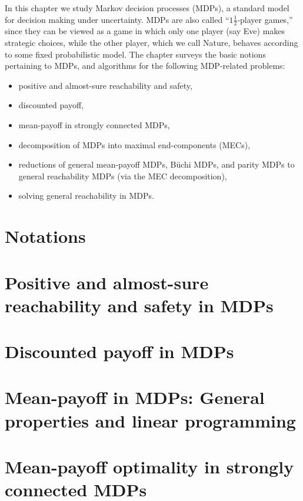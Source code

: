 

In this chapter we study Markov decision processes (MDPs), a standard model for decision making under uncertainty. MDPs are also called ``$1\frac{1}{2}$-player games,'' since they can be viewed as a game in which only one player (say Eve) makes strategic choices, while the other player, which we call Nature, behaves according to some fixed probabilistic model. The chapter surveys the basic notions pertaining to MDPs, and algorithms for the following MDP-related problems:

\begin{itemize}
\item positive and almost-sure reachability and safety,
\item discounted payoff,
\item mean-payoff in strongly connected MDPs,
\item decomposition of MDPs into maximal end-components (MECs),
\item reductions of general mean-payoff MDPs, B{\"u}chi MDPs, and parity MDPs to general reachability MDPs (via the MEC decomposition),
\item solving general reachability in MDPs.
\end{itemize}

\section*{Notations}
\label{5-sec:notations}


\section{Positive and almost-sure reachability and safety in MDPs}
\label{5-sec:reachability}


\section{Discounted payoff in MDPs}
\label{5-sec:discounted}


\section{Mean-payoff in MDPs: General properties and linear programming}
\label{5-sec:mean_payoff_properties}


\section{Mean-payoff optimality in strongly connected MDPs}
\label{5-sec:mean_payoff_strongly_connected}


